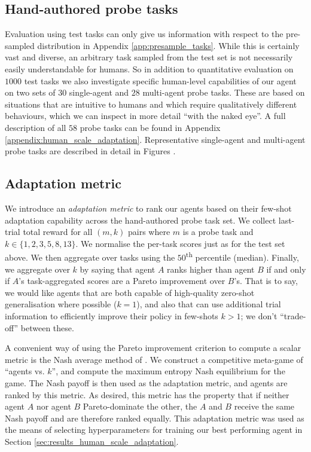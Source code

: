 \subsection{Hand-authored probe tasks} 
Evaluation using test tasks can only give us information with respect to the pre-sampled distribution in Appendix \ref{app:presample_tasks}. While this is certainly vast and diverse, an arbitrary task sampled from the test set is not necessarily easily understandable for humans. So in addition to quantitative evaluation on $1000$ test tasks we also investigate specific human-level capabilities of our agent on two sets of $30$ single-agent and $28$ multi-agent probe tasks. These are based on situations that are intuitive to humans and which require qualitatively different behaviours, which we can inspect in more detail ``with the naked eye''. A full description of all $58$ probe tasks can be found in Appendix \ref{appendix:human_scale_adaptation}. Representative single-agent and multi-agent probe tasks are described in detail in Figures .

\subsection{Adaptation metric} 

We introduce an \textit{adaptation metric} to rank our agents based on their few-shot adaptation capability across the hand-authored probe task set. We collect last-trial total reward for all $(m, k)$ pairs where $m$ is a probe task and $k \in \{1, 2, 3, 5, 8, 13\}$. We normalise the per-task scores just as for the test set above. We then aggregate over tasks using the $50$\textsuperscript{th} percentile (median). Finally, we aggregate over $k$ by saying that agent $A$ ranks higher than agent $B$ if and only if $A$'s task-aggregated scores are a Pareto improvement over $B$'s. That is to say, we would like agents that are both capable of high-quality zero-shot generalisation where possible ($k = 1$), and also that can use additional trial information to efficiently improve their policy in few-shots $k > 1$; we don't ``trade-off'' between these. 

A convenient way of using the Pareto improvement criterion to compute a scalar metric is the Nash average method of \citet{balduzzi2018re}. We construct a competitive meta-game of ``agents vs. $k$'', and compute the maximum entropy Nash equilibrium for the game. The Nash payoff is then used as the adaptation metric, and agents are ranked by this metric. As desired, this metric has the property that if neither agent $A$ nor agent $B$ Pareto-dominate the other, the $A$ and $B$ receive the same Nash payoff and are therefore ranked equally. This adaptation metric was used as the means of selecting hyperparameters for training our best performing agent in Section \ref{sec:results_human_scale_adaptation}.

